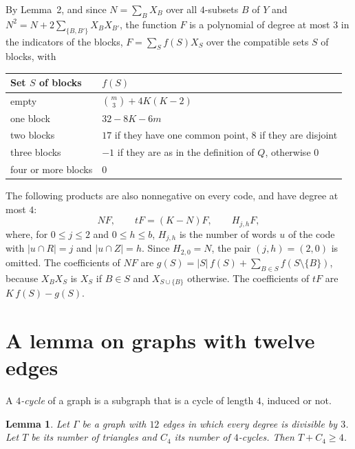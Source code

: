 \documentclass[11pt,a4paper]{article}
\newtheorem{lemma}{Lemma}
\newcommand{\abs}[1]{\lvert #1\rvert}
\begin{document}
By Lemma~2, and since $N=\sum_BX_B$ over all $4$-subsets $B$ of $Y$ and
$N^2=N+2\sum_{\{B,B'\}}X_BX_{B'}$, the function $F$ is a polynomial of
degree at most $3$ in the indicators of the blocks, $F=\sum_Sf(S)X_S$ over
the compatible sets $S$ of blocks, with
\begin{center}
\begin{tabular}{ll}
\hline
Set $S$ of blocks & $f(S)$ \\
\hline
empty & $\binom m3+4K(K-2)$ \\
one block & $32-8K-6m$ \\
two blocks & $17$ if they have one common point, $8$ if they are disjoint\\
three blocks & $-1$ if they are as in the definition of $Q$, otherwise $0$\\
four or more blocks & $0$\\
\hline
\end{tabular}
\end{center}
The following products are also nonnegative on every code, and have degree
at most $4$:
\[
N\!F,\qquad tF=(K-N)F,\qquad H_{j,h}F ,
\]
where, for $0\le j\le 2$ and $0\le h\le b$, $H_{j,h}$ is the number of
words $u$ of the code with $\abs{u\cap R}=j$ and $\abs{u\cap Z}=h$. Since
$H_{2,0}=N$, the pair $(j,h)=(2,0)$ is omitted. The coefficients of $N\!F$
are $g(S)=\abs S\,f(S)+\sum_{B\in S}f(S\setminus\{B\})$, because
$X_BX_S$ is $X_S$ if $B\in S$ and $X_{S\cup\{B\}}$ otherwise. The
coefficients of $tF$ are $K\,f(S)-g(S)$.

\section{A lemma on graphs with twelve edges}

A \emph{$4$-cycle} of a graph is a subgraph that is a cycle of length $4$,
induced or not.

\begin{lemma}
Let $\Gamma$ be a graph with $12$ edges in which every degree is divisible
by $3$. Let $T$ be its number of triangles and $C_4$ its number of
$4$-cycles. Then $T+C_4\ge 4$.
\end{lemma}
\end{document}
